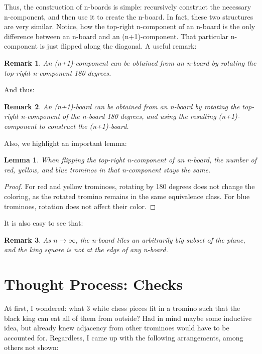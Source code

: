 \documentclass{article}
\begin{document}
    Thus, the construction of n-boards is simple: recursively construct the necessary n-component, and then use it to create the n-board. In fact, these two structures are very similar. Notice, how the top-right n-component of an n-board is the only difference between an n-board and an (n+1)-component. That particular n-component is just flipped along the diagonal. A useful remark:

    \newtheorem*{remark}{Remark}
    \begin{remark}
    An (n+1)-component can be obtained from an n-board by rotating the top-right n-component 180 degrees.
    \end{remark}

    And thus:
    \begin{remark}
    An (n+1)-board can be obtained from an n-board by rotating the top-right n-component of the n-board 180 degrees, and using the resulting (n+1)-component to construct the (n+1)-board.
    \end{remark}
    Also, we highlight an important lemma:
    \newtheorem{lemma}[theorem]{Lemma}
    \begin{lemma}
    When flipping the top-right n-component of an n-board, the number of red, yellow, and blue trominos in that n-component stays the same.
    \end{lemma}
    \begin{proof}
    For red and yellow trominoes, rotating by 180 degrees does not change the coloring, as the rotated tromino remains in the same equivalence class. For blue trominoes, rotation does not affect their color.
    \end{proof}

    It is also easy to see that:
    \begin{remark}
    As $n \to \infty$, the n-board tiles an arbitrarily big subset of the plane, and the king square is not at the edge of any n-board. 
    \end{remark}

    \section*{Thought Process: Checks}

    At first, I wondered: what 3 white chess pieces fit in a tromino such that the black king can eat all of them from outside? Had in mind maybe some inductive idea, but already knew adjacency from other trominoes would have to be accounted for. Regardless, I came up with the following arrangements, among others not shown:
\end{document}

